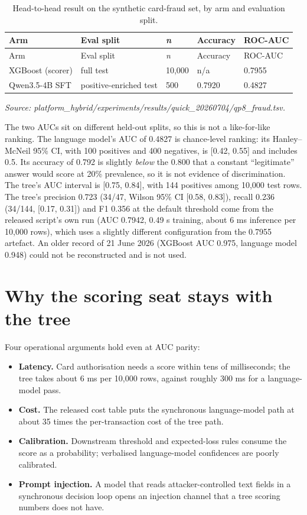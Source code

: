 \documentclass[12pt,a4paper]{report}
\providecommand{\tightlist}{%
  \setlength{\itemsep}{0pt}\setlength{\parskip}{0pt}}
\begin{document}
\begin{longtable}[]{@{}lllll@{}}
\caption{Head-to-head result on the synthetic card-fraud set, by arm and
evaluation split.}\tabularnewline
\toprule\noalign{}
Arm & Eval split & \emph{n} & Accuracy & ROC-AUC \\
\midrule\noalign{}
\endfirsthead
\toprule\noalign{}
Arm & Eval split & \emph{n} & Accuracy & ROC-AUC \\
\midrule\noalign{}
\endhead
\bottomrule\noalign{}
\endlastfoot
XGBoost (scorer) & full test & 10,000 & n/a & 0.7955 \\
Qwen3.5-4B SFT & positive-enriched test & 500 & 0.7920 & 0.4827 \\
\end{longtable}

\emph{Source:
platform\_hybrid/experiments/results/quick\_20260704/qp8\_fraud.tsv.}

The two AUCs sit on different held-out splits, so this is not a
like-for-like ranking. The language model's AUC of 0.4827 is
chance-level ranking: its Hanley--McNeil 95\% CI, with 100 positives and
400 negatives, is {[}0.42, 0.55{]} and includes 0.5. Its accuracy of
0.792 is slightly \emph{below} the 0.800 that a constant ``legitimate''
answer would score at 20\% prevalence, so it is not evidence of
discrimination. The tree's AUC interval is {[}0.75, 0.84{]}, with 144
positives among 10,000 test rows. The tree's precision 0.723 (34/47,
Wilson 95\% CI {[}0.58, 0.83{]}), recall 0.236 (34/144, {[}0.17,
0.31{]}) and F1 0.356 at the default threshold come from the released
script's own run (AUC 0.7942, 0.49 s training, about 6 ms inference per
10,000 rows), which uses a slightly different configuration from the
0.7955 artefact. An older record of 21 June 2026 (XGBoost AUC 0.975,
language model 0.948) could not be reconstructed and is not used.

\section{Why the scoring seat stays with the
tree}\label{why-the-scoring-seat-stays-with-the-tree}

Four operational arguments hold even at AUC parity:

\begin{itemize}
\tightlist
\item
  \textbf{Latency.} Card authorisation needs a score within tens of
  milliseconds; the tree takes about 6 ms per 10,000 rows, against
  roughly 300 ms for a language-model pass.
\item
  \textbf{Cost.} The released cost table puts the synchronous
  language-model path at about 35 times the per-transaction cost of the
  tree path.
\item
  \textbf{Calibration.} Downstream threshold and expected-loss rules
  consume the score as a probability; verbalised language-model
  confidences are poorly calibrated.
\item
  \textbf{Prompt injection.} A model that reads attacker-controlled text
  fields in a synchronous decision loop opens an injection channel that
  a tree scoring numbers does not have.
\end{itemize}
\end{document}
